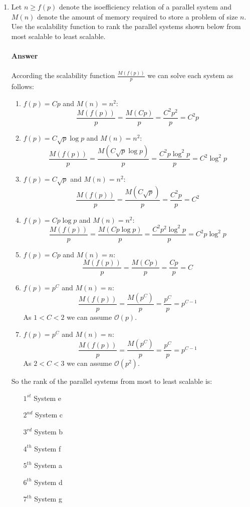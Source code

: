 \documentclass[10pt]{scrartcl}
\begin{document}
\begin{enumerate}
 \item Let $n \geqslant f(p)$ denote the isoefficiency relation of a parallel system and $M(n)$ denote the amount of memory required to store a problem of size $n$. Use the scalability function to rank the parallel systems shown below from most scalable to least scalable.\\
 \\ 
 \textbf{Answer}\\
 \\
 According the scalability function $\frac{M(f(p))}{p}$ we can solve each system as follows:
 \begin{enumerate}
  \item $f(p)=Cp$ and $M(n)=n^2$:
  $$\frac{M(f(p))}{p} = \frac{M(Cp)}{p} = \frac{C^2p^2}{p} = C^2p$$
  \item $f(p)=C\sqrt{p}\log{p}$ and $M(n)=n^2$:
  $$\frac{M(f(p))}{p} = \frac{M(C\sqrt{p}\log{p})}{p} = \frac{C^2p\log^2{p}}{p} = C^2\log^2{p}$$
  \item $f(p)=C\sqrt{p}$ and $M(n)=n^2$:
  $$\frac{M(f(p))}{p} = \frac{M(C\sqrt{p})}{p} = \frac{C^2p}{p} = C^2$$
  \item $f(p)=Cp\log{p}$ and $M(n)=n^2$:
  $$\frac{M(f(p))}{p} = \frac{M(Cp\log{p})}{p} = \frac{C^2p^2\log^2{p}}{p} = C^2p\log^2{p}$$
  \item $f(p)=Cp$ and $M(n)=n$:
  $$\frac{M(f(p))}{p} = \frac{M(Cp)}{p} = \frac{Cp}{p} = C$$
  \item $f(p)=p^C$ and $M(n)=n$:
  $$\frac{M(f(p))}{p} = \frac{M(p^C)}{p} = \frac{p^C}{p} = p^{C-1}$$
  As $1 < C < 2$ we can assume $\mathcal{O}(p)$.
  \item $f(p)=p^C$ and $M(n)=n$:
  $$\frac{M(f(p))}{p} = \frac{M(p^C)}{p} = \frac{p^C}{p} = p^{C-1}$$
  As $2 < C < 3$ we can assume $\mathcal{O}(p^2)$.
 \end{enumerate}
 So the rank of the parallel systems from most to least scalable is:
\begin{itemize}
    \item[$1^{st}$] System e
    \item[$2^{nd}$] System c
    \item[$3^{rd}$] System b
    \item[$4^{th}$] System f
    \item[$5^{th}$] System a
    \item[$6^{th}$] System d
    \item[$7^{th}$] System g
\end{itemize}



\end{enumerate}
\end{document}
